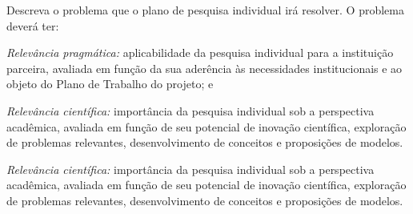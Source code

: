 
Descreva o problema que o plano de pesquisa individual irá resolver. O problema deverá ter:

\begin{alineas}
    \item \emph{Relevância pragmática:} aplicabilidade da pesquisa individual para a instituição parceira, avaliada em função da sua aderência às necessidades institucionais e ao objeto do Plano de Trabalho do projeto; e
    
    \item \emph{Relevância científica:} importância da pesquisa individual sob a perspectiva acadêmica, avaliada em função de seu potencial de inovação científica, exploração de problemas relevantes, desenvolvimento de conceitos e proposições de modelos.    
    
    \item \emph{Relevância científica:} importância da pesquisa individual sob a perspectiva acadêmica, avaliada em função de seu potencial de inovação científica, exploração de problemas relevantes, desenvolvimento de conceitos e proposições de modelos.    
\end{alineas}
